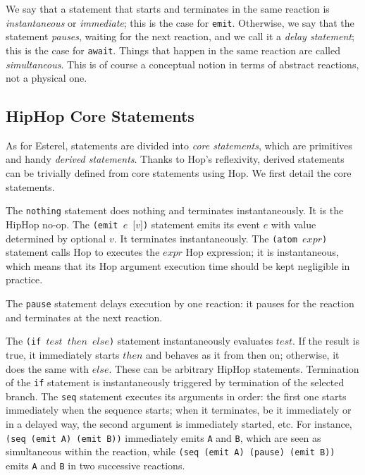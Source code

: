 \documentclass{llncs}
\begin{document}
We say that a statement that starts and terminates in the same
reaction is {\em{instantaneous}} or {\em{immediate}}; this is the case for
{\texttt{emit{}}}.  Otherwise, we say that the statement {\em{pauses}}, waiting
for the next reaction, and we call it a {\em{delay statement}}; this is
the case for {\texttt{await{}}}.  Things that happen in the same reaction are
called {\em{simultaneous}}. This is of course a conceptual notion in
terms of abstract reactions, not a physical one.


\subsection{HipHop Core Statements}
\label{HipHop core statements}

As for Esterel, statements are divided into {\em{core statements}},
which are primitives and handy {\em{derived statements}}. Thanks to
Hop's reflexivity, derived statements can be trivially defined from
core statements using Hop. We first detail the core statements.

The {\texttt{nothing{}}} statement does nothing and terminates
instantaneously. It is the HipHop no-op. 
The {\texttt{(emit{} $e$ }}[$v$]\texttt{)} statement emits its event $e$ with value
determined by optional
$v$. It terminates instantaneously.
The {\texttt{(atom{} $expr$)}} statement calls Hop to executes the $expr$ Hop
expression; it is instantaneous, which means that its Hop argument
execution time should be kept negligible in practice.

The {\texttt{pause{}}} statement delays execution by one reaction:
it pauses for the reaction and terminates at the next
reaction.

The {\texttt{(if{} $test$ $then$ $else$)}} statement instantaneously evaluates $test$. If the
result is true, it immediately starts $then$ and
behaves as it from then on; otherwise, it does the same with $else$. These can be arbitrary 
HipHop statements. Termination of the {\texttt{if{}}} statement is
instantaneously triggered by termination of the selected branch.
The {\texttt{seq{}}} statement executes its arguments in order: the first
one starts immediately when the sequence starts; when it
terminates, be it immediately or in a delayed way, the second argument
is immediately started, etc. For instance, {\texttt{(seq{} (emit{} A) (emit{}
B))}} immediately emits {\texttt{A}} and {\texttt{B}}, which are seen as
simultaneous within the reaction, while {\texttt{(seq{} (emit{} A) (pause{})
(emit{} B))}} emits {\texttt{A}} and {\texttt{B}} in two successive reactions.
\end{document}
